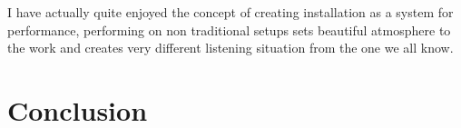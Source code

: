 \documentclass[12pt,a4paper,oneside]{report}
\begin{document}
I have actually quite enjoyed the concept of creating installation as a system for performance, performing on non traditional setups sets beautiful atmosphere to the work and creates very different listening situation from the one we all know. 


\chapter{Conclusion}

\appendix


\onehalfspacing

 

\end{document}
